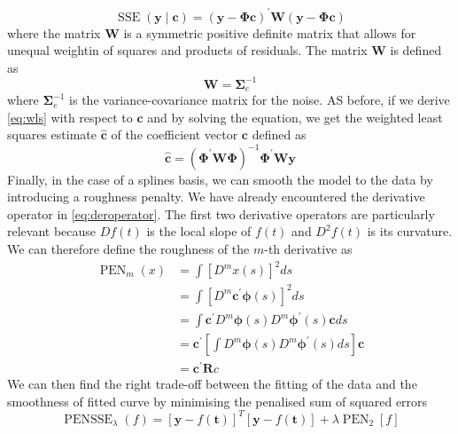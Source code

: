 \begin{equation}
    \label{eq:wls}
    \operatorname{SSE}(\mathbf{y} \mid \mathbf{c})=(\mathbf{y}-\bm{\Phi} \mathbf{c})^{\prime} \mathbf{W}(\mathbf{y}-\bm{\Phi} \mathbf{c})
\end{equation}
where the matrix $\mathbf{W}$ is a symmetric positive definite matrix that allows for unequal weightin of squares and products of residuals. The matrix $\mathbf{W}$ is defined as
\begin{equation}
    \mathbf{W}=\bm{\Sigma}_e^{-1}
\end{equation}
where $\bm{\Sigma}_e^{-1}$ is the variance-covariance matrix for the noise. AS before, if we derive \ref{eq:wls} with respect to $\mathbf{c}$ and by solving the equation, we get the weighted least squares estimate $\hat{\mathbf{c}}$ of the coefficient vector $\mathbf{c}$ defined as
\begin{equation}
    \hat{\mathbf{c}}=\left(\bm{\Phi}^{\prime} \mathbf{W} \bm{\Phi}\right)^{-1} \bm{\Phi}^{\prime} \mathbf{W} \mathbf{y}
\end{equation}
Finally, in the case of a splines basis, we can smooth the model to the data by introducing a roughness penalty. We have already encountered the derivative operator in \ref{eq:deroperator}. The first two derivative operators are particularly relevant because  $Df(t)$ is the local slope of $f(t)$ and $D^2f(t)$ is its curvature. We can therefore define the roughness of the $m$-th derivative as
\begin{equation}
    \label{eq:roughness}
    \begin{aligned}
\operatorname{PEN}_m(x) & =\int\left[D^m x(s)\right]^2 d s \\
& =\int\left[D^m \mathbf{c}^{\prime} \boldsymbol{\phi}(s)\right]^2 d s \\
& =\int \mathbf{c}^{\prime} D^m \boldsymbol{\phi}(s) D^m \boldsymbol{\phi}^{\prime}(s) \mathbf{c} d s \\
& =\mathbf{c}^{\prime}\left[\int D^m \boldsymbol{\phi}(s) D^m \boldsymbol{\phi}^{\prime}(s) d s\right] \mathbf{c} \\
& =\mathbf{c}^{\prime} \mathbf{R} c
\end{aligned}
\end{equation}
We can then find the right trade-off between the fitting of the data and the smoothness of fitted curve by minimising the penalised sum of squared errors
\begin{equation}
    \label{eq:pensse}
    \operatorname{PENSSE}_\lambda(f)=[\mathbf{y}-f(\mathbf{t})]^T[\mathbf{y}-f(\mathbf{t})]+\lambda \operatorname{PEN}_2[f]
\end{equation}
